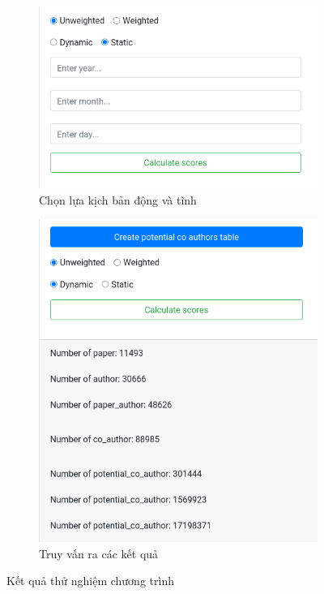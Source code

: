 \documentclass{article}
\begin{document}
\begin{figure}[h]
\begin{subfigure}{.5\textwidth}
  \centering
  \includegraphics[width=.8\linewidth]{image/static.png}
  \caption{Chọn lựa kịch bản động và tĩnh}
  \label{fig:sfig1}
\end{subfigure}%
\begin{subfigure}{.5\textwidth}
  \centering
  \includegraphics[width=.8\linewidth]{image/query.png}
  \caption{Truy vấn ra các kết quả}
  \label{fig:sfig2}
\end{subfigure}
\caption{Kết quả thử nghiệm chương trình}
\label{fig:fig}
\end{figure}




\newpage
\end{document}
